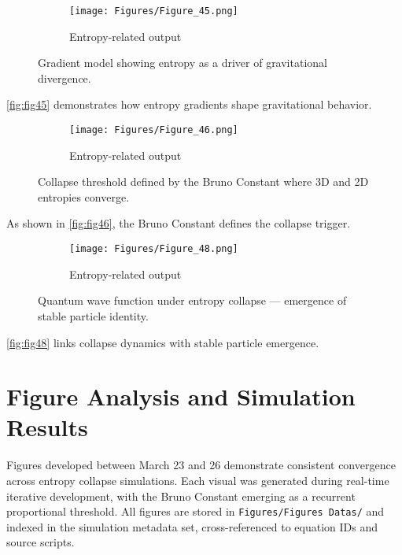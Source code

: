 \documentclass[12pt]{article}
\begin{document}
\begin{figure}[H]
    \centering
    \begin{figure}[H]
\centering
\texttt{[image: Figures/Figure\_45.png]}
\caption{Entropy-related output}
\label{fig:Figures_Figure_45_png}
\end{figure}

    \caption{Gradient model showing entropy as a driver of gravitational divergence.}
    \label{fig:fig45}
\end{figure}
\autoref{fig:fig45} demonstrates how entropy gradients shape gravitational behavior.

\begin{figure}[H]
    \centering
    \begin{figure}[H]
\centering
\texttt{[image: Figures/Figure\_46.png]}
\caption{Entropy-related output}
\label{fig:Figures_Figure_46_png}
\end{figure}

    \caption{Collapse threshold defined by the Bruno Constant where 3D and 2D entropies converge.}
    \label{fig:fig46}
\end{figure}
As shown in \autoref{fig:fig46}, the Bruno Constant defines the collapse trigger.

\begin{figure}[H]
    \centering
    \begin{figure}[H]
\centering
\texttt{[image: Figures/Figure\_48.png]}
\caption{Entropy-related output}
\label{fig:Figures_Figure_48_png}
\end{figure}

    \caption{Quantum wave function under entropy collapse — emergence of stable particle identity.}
    \label{fig:fig48}
\end{figure}
\autoref{fig:fig48} links collapse dynamics with stable particle emergence.


\section{Figure Analysis and Simulation Results}
Figures developed between March 23 and 26 demonstrate consistent convergence across entropy collapse simulations. Each visual was generated during real-time iterative development, with the Bruno Constant emerging as a recurrent proportional threshold. All figures are stored in \texttt{Figures/Figures Datas/} and indexed in the simulation metadata set, cross-referenced to equation IDs and source scripts.
\end{document}
